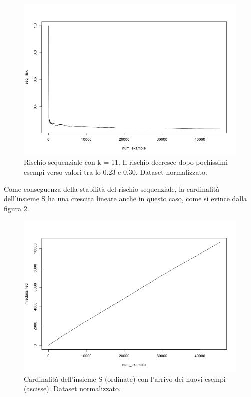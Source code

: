 \documentclass[fleqn,10pt]{SelfArx} %
\begin{document}
\begin{figure}
\includegraphics[scale=0.35]{knn_online_norm/seq_risk_final.png}
\caption{\footnotesize{Rischio sequenziale con k = 11. Il rischio decresce dopo pochissimi esempi verso valori tra lo 0.23 e 0.30. Dataset normalizzato.}}
\label{cross:seqrisk1}
\end{figure}

Come conseguenza della stabilità del rischio sequenziale, la cardinalità dell'insieme S ha una crescita lineare anche in questo caso, come si evince dalla figura \ref{cross:misclass1}.
\newline 

\begin{figure}
\includegraphics[scale=0.30]{knn_online_norm/misclassified_final.png}
\caption{\footnotesize{Cardinalità dell'insieme S (ordinate) con l'arrivo dei nuovi esempi (ascisse). Dataset normalizzato.}}
\label{cross:misclass1}
\end{figure}
\end{document}
